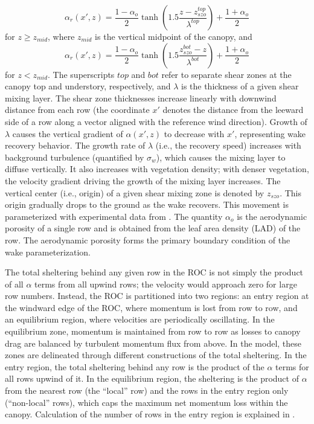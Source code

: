\begin{equation}\label{wakeAlpha}
\alpha_r(x',z) = \frac{1-\alpha_{o}}{2}\tanh\left(1.5\frac{z-z_{szo}^{top}}{\lambda^{top}}\right) + \frac{1+\alpha_{o}}{2}
\end{equation}
for $z \geq z_{mid}$, where $z_{mid}$ is the vertical midpoint of the canopy, and
\begin{equation}
\alpha_r(x',z) = \frac{1-\alpha_{o}}{2}\tanh\left(1.5\frac{z_{szo}^{bot}-z}{\lambda^{bot}}\right) + \frac{1+\alpha_{o}}{2}
\end{equation}
for $z < z_{mid}$. The superscripts $top$ and $bot$ refer to separate shear zones at the canopy top and understory, respectively, and $\lambda$ is the thickness of a given shear mixing layer. The shear zone thicknesses increase linearly with downwind distance from each row (the coordinate $x'$ denotes the distance from the leeward side of a row along a vector aligned with the reference wind direction). Growth of $\lambda$ causes the vertical gradient of $\alpha(x',z)$ to decrease with $x'$, representing wake recovery behavior. The growth rate of $\lambda$ (i.e., the recovery speed) increases with background turbulence (quantified by $\sigma_w$), which causes the mixing layer to diffuse vertically. It also increases with vegetation density; with denser vegetation, the velocity gradient driving the growth of the mixing layer increases.
The vertical center (i.e., origin) of a given shear mixing zone is denoted by $z_{szo}$. This origin gradually drops to the ground as the wake recovers. This movement is parameterized with experimental data from \cite{torkelson2022momentum}.
The quantity $\alpha_o$ is the aerodynamic porosity of a single row and is obtained from the leaf area density (LAD) of the row. The aerodynamic porosity forms the primary boundary condition of the wake parameterization.

The total sheltering behind any given row in the ROC is not simply the product of all $\alpha$ terms from all upwind rows; the velocity would approach zero for large row numbers. Instead, the ROC is partitioned into two regions: an entry region at the windward edge of the ROC, where momentum is lost from row to row, and an equilibrium region, where velocities are periodically oscillating. In the equilibrium zone, momentum is maintained from row to row as losses to canopy drag are balanced by turbulent momentum flux from above.
In the model, these zones are delineated through different constructions of the total sheltering. In the entry region, the total sheltering behind any row is the product of the $\alpha$ terms for all rows upwind of it. In the equilibrium region, the sheltering is the product of $\alpha$ from the nearest row (the ``local'' row) and the rows in the entry region only (``non-local'' rows), which caps the maximum net momentum loss within the canopy. Calculation of the number of rows in the entry region is explained in \cite{ulmer2023fast}.

